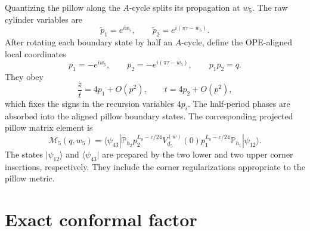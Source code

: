 \documentclass[11pt]{article}
\newcommand{\cM}{\mathcal M}
\newcommand{\PP}{\mathbb P}
\begin{document}
Quantizing the pillow along the $A$-cycle splits its propagation at $w_5$.
The raw cylinder variables are
\begin{equation}
 \widetilde p_1=e^{iw_5},\qquad
 \widetilde p_2=e^{i(\pi\tau-w_5)}.
\end{equation}
After rotating each boundary state by half an $A$-cycle, define the
OPE-aligned local coordinates
\begin{equation}
 p_1=-e^{iw_5},\qquad
 p_2=-e^{i(\pi\tau-w_5)},\qquad
 \boxed{p_1p_2=q}.
 \label{eq:segment-nomes}
\end{equation}
They obey
\begin{equation}
 \frac{z}{t}=4p_1+O(p^2),\qquad t=4p_2+O(p^2),
 \label{eq:aligned-cusp}
\end{equation}
which fixes the signs in the recursion variables $4p_i$.  The half-period
phases are absorbed into the aligned pillow boundary states.
The corresponding projected pillow matrix element is
\begin{equation}
 \boxed{
 \cM_5(q,w_5)=
 \langle\psi_{43}|\PP_{h_2}
 p_2^{L_0-c/24}V_{d_5}^{(w)}(0)
 p_1^{L_0-c/24}\PP_{h_1}|\psi_{12}\rangle .}
 \label{eq:pillow-matrix-element}
\end{equation}
The states $|\psi_{12}\rangle$ and $\langle\psi_{43}|$ are prepared by the
two lower and two upper corner insertions, respectively.  They include the
corner regularizations appropriate to the pillow metric.

\section{Exact conformal factor}
\end{document}
